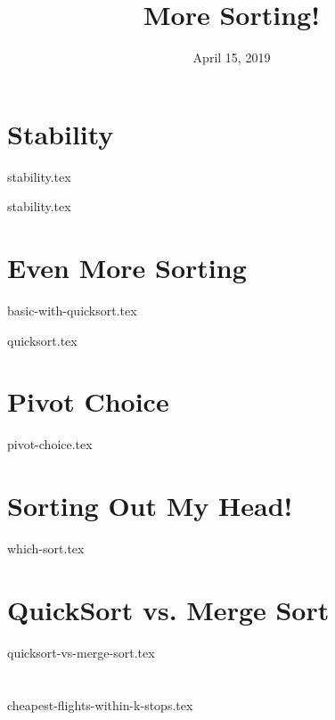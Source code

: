 \documentclass[11pt]{exam}
\title{More Sorting!}
\date{April 15, 2019}
\begin{document}
\maketitle

\section{Stability}
{stability.tex}
\begin{questions}
{stability.tex}
\end{questions}

\clearpage

\section{Even More Sorting}
{basic-with-quicksort.tex}
\begin{questions}
{quicksort.tex}
\end{questions}

\clearpage

\section{Pivot Choice}
\begin{questions}
{pivot-choice.tex}
\end{questions}

\clearpage

\section{Sorting Out My Head!}
\begin{questions}
{which-sort.tex}
\end{questions}

\clearpage

\section{QuickSort vs. Merge Sort}
\begin{questions}
{quicksort-vs-merge-sort.tex}
\end{questions}
\clearpage


\section{}
\begin{questions}
{cheapest-flights-within-k-stops.tex}

\end{questions}
\clearpage
\end{document}
